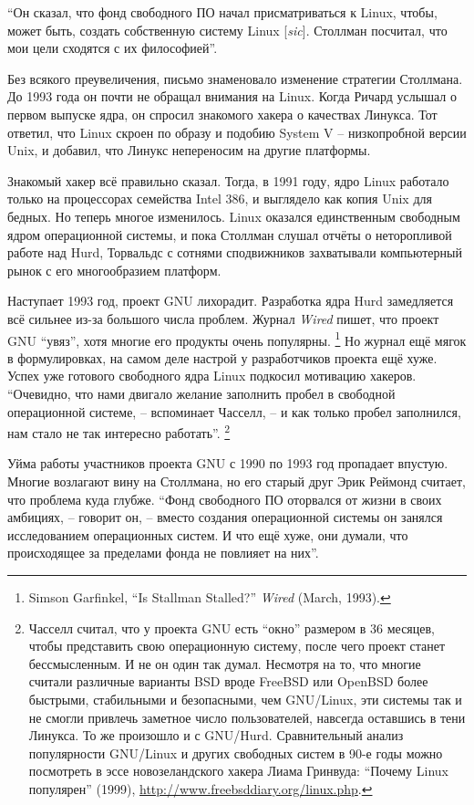 \enquote{Он сказал, что фонд свободного ПО начал присматриваться к Linux, чтобы, может быть, создать собственную систему Linux [\textit{sic}]. Столлман посчитал, что мои цели сходятся с их философией}.

Без всякого преувеличения, письмо знаменовало изменение стратегии Столлмана. До 1993 года он почти не обращал внимания на Linux. Когда Ричард услышал о первом выпуске ядра, он спросил знакомого хакера о качествах Линукса. Тот ответил, что Linux скроен по образу и подобию System V -- низкопробной версии Unix, и добавил, что Линукс непереносим на другие платформы.

Знакомый хакер всё правильно сказал. Тогда, в 1991 году, ядро Linux работало только на процессорах семейства Intel 386, и выглядело как копия Unix для бедных. Но теперь многое изменилось. Linux оказался единственным свободным ядром операционной системы, и пока Столлман слушал отчёты о неторопливой работе над Hurd, Торвальдс с сотнями сподвижников захватывали компьютерный рынок с его многообразием платформ.

Наступает 1993 год, проект GNU лихорадит. Разработка ядра Hurd замедляется всё сильнее из-за большого числа проблем. Журнал \textit{Wired} пишет, что проект GNU \enquote{увяз}, хотя многие его продукты очень популярны. \footnote{Simson Garfinkel, \enquote{Is Stallman Stalled?} \textit{Wired} (March, 1993).} Но журнал ещё мягок в формулировках, на самом деле настрой у разработчиков проекта ещё хуже. Успех уже готового свободного ядра Linux подкосил мотивацию хакеров. \enquote{Очевидно, что нами двигало желание заполнить пробел в свободной операционной системе, -- вспоминает Часселл, -- и как только пробел заполнился, нам стало не так интересно работать}. \footnote{Часселл считал, что у проекта GNU есть \enquote{окно} размером в 36 месяцев, чтобы представить свою операционную систему, после чего проект станет бессмысленным. И не он один так думал. Несмотря на то, что многие считали различные варианты BSD вроде FreeBSD или OpenBSD более быстрыми, стабильными и безопасными, чем GNU/Linux, эти системы так и не смогли привлечь заметное число пользователей, навсегда оставшись в тени Линукса. То же произошло и с GNU/Hurd. Сравнительный анализ популярности GNU/Linux и других свободных систем в 90-е годы можно посмотреть в эссе новозеландского хакера Лиама Гринвуда: \enquote{Почему Linux популярен} (1999), \url{http://www.freebsddiary.org/linux.php}.}

Уйма работы участников проекта GNU с 1990 по 1993 год пропадает впустую. Многие возлагают вину на Столлмана, но его старый друг Эрик Реймонд считает, что проблема куда глубже. \enquote{Фонд свободного ПО оторвался от жизни в своих амбициях, -- говорит он, -- вместо создания операционной системы он занялся исследованием операционных систем. И что ещё хуже, они думали, что происходящее за пределами фонда не повлияет на них}.

